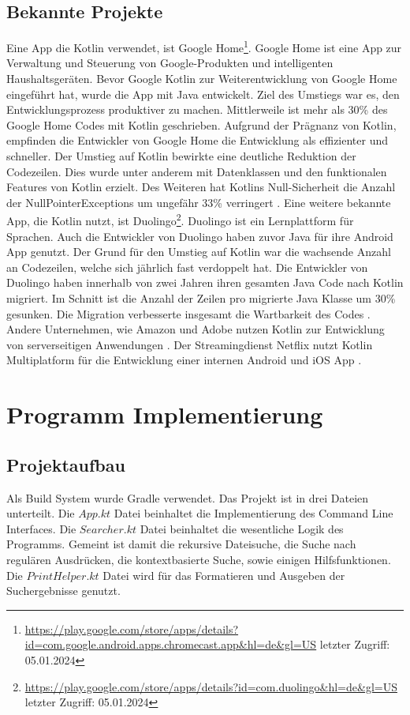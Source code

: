 \documentclass{article}
\begin{document}
\subsection{Bekannte Projekte}
Eine App die Kotlin verwendet, ist Google Home\footnote{\url{https://play.google.com/store/apps/details?id=com.google.android.apps.chromecast.app&hl=de&gl=US} letzter Zugriff: 05.01.2024}. Google Home ist eine App zur Verwaltung und Steuerung von Google-Produkten und intelligenten Haushaltsgeräten. Bevor Google Kotlin zur Weiterentwicklung von Google Home eingeführt hat, wurde die App mit Java entwickelt. Ziel des Umstiegs war es, den Entwicklungsprozess produktiver zu machen. Mittlerweile ist mehr als 30\% des Google Home Codes mit Kotlin geschrieben. Aufgrund der Prägnanz von Kotlin, empfinden die Entwickler von Google Home die Entwicklung als effizienter und schneller. Der Umstieg auf Kotlin bewirkte eine deutliche Reduktion der Codezeilen. Dies wurde unter anderem mit Datenklassen und den funktionalen Features von Kotlin erzielt. Des Weiteren hat Kotlins Null-Sicherheit die Anzahl der NullPointerExceptions um ungefähr 33\% verringert \cite{GoogleHome}.
\newline
Eine weitere bekannte App, die Kotlin nutzt, ist Duolingo\footnote{\url{https://play.google.com/store/apps/details?id=com.duolingo&hl=de&gl=US} letzter Zugriff: 05.01.2024}. Duolingo ist ein Lernplattform für Sprachen. Auch die Entwickler von Duolingo haben zuvor Java für ihre Android App genutzt. Der Grund für den Umstieg auf Kotlin war die wachsende Anzahl an Codezeilen, welche sich jährlich fast verdoppelt hat. Die Entwickler von Duolingo haben innerhalb von zwei Jahren ihren gesamten Java Code nach Kotlin migriert. Im Schnitt ist die Anzahl der Zeilen pro migrierte Java Klasse um 30\% gesunken. Die Migration verbesserte insgesamt die Wartbarkeit des Codes \cite{Duolingo}.
\newline
Andere Unternehmen, wie Amazon und Adobe nutzen Kotlin zur Entwicklung von serverseitigen Anwendungen \cite{KotlinLangCaseStudies}. Der Streamingdienst Netflix nutzt Kotlin Multiplatform für die Entwicklung einer internen Android und iOS App \cite{Netflx}.

\section{Programm Implementierung}
\subsection{Projektaufbau}
Als Build System wurde Gradle verwendet. Das Projekt ist in drei Dateien unterteilt. Die $App.kt$ Datei beinhaltet die Implementierung des Command Line Interfaces. Die $Searcher.kt$ Datei beinhaltet die wesentliche Logik des Programms. Gemeint ist damit die rekursive Dateisuche, die Suche nach regulären Ausdrücken, die kontextbasierte Suche, sowie einigen Hilfsfunktionen. Die $PrintHelper.kt$ Datei wird für das Formatieren und Ausgeben der Suchergebnisse genutzt.
\end{document}

